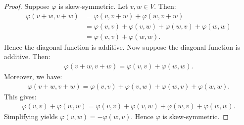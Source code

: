 \documentclass[11pt,twoside,openany]{memoir}
\begin{document}
        \begin{proof}
            Suppose $\varphi$ is skew-symmetric. Let $v,w \in V$. Then:
                \begin{equation*}
                \begin{split}
                    \varphi(v+w,v+w)
                    & = \varphi(v,v+w) + \varphi(w,v+w) \\
                    & = \varphi(v,v) + \varphi(v,w) + \varphi(w,v) + \varphi(w,w) \\
                    & = \varphi(v,v) + \varphi(w,w).
                \end{split}
                \end{equation*}
            Hence the diagonal function is additive. Now suppose the diagonal function is additive. Then:
                \begin{equation*}
                \begin{split}
                    \varphi(v+w,v+w) = \varphi(v,v) + \varphi(w,w).
                \end{split}
                \end{equation*}
            Moreover, we have:
                \begin{equation*}
                \begin{split}
                    \varphi(v+w,v+w) = \varphi(v,v) + \varphi(v,w) + \varphi(w,v) + \varphi(w,w).
                \end{split}
                \end{equation*}
            This gives:
                \begin{equation*}
                \begin{split}
                    \varphi(v,v) + \varphi(w,w) = \varphi(v,v) + \varphi(v,w) + \varphi(w,v) + \varphi(w,w).
                \end{split}
                \end{equation*}
            Simplifying yields $\varphi(v,w) = -\varphi(w,v)$. Hence $\varphi$ is skew-symmetric.
        \end{proof}
\end{document}
